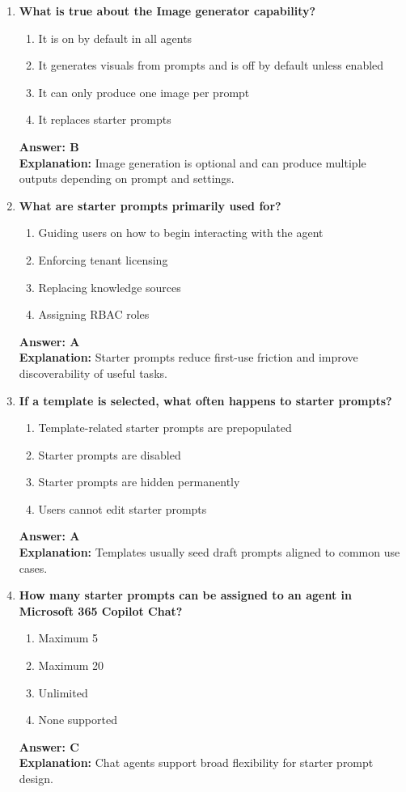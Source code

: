 \documentclass[10pt]{article}
\begin{document}
\begin{enumerate}[leftmargin=*]
\item \textbf{What is true about the Image generator capability?}
\begin{enumerate}[label=\Alph*.]
  \item It is on by default in all agents
  \item It generates visuals from prompts and is off by default unless enabled
  \item It can only produce one image per prompt
  \item It replaces starter prompts
\end{enumerate}
\textbf{Answer: B}\\
\textbf{Explanation:} Image generation is optional and can produce multiple outputs depending on prompt and settings.

\item \textbf{What are starter prompts primarily used for?}
\begin{enumerate}[label=\Alph*.]
  \item Guiding users on how to begin interacting with the agent
  \item Enforcing tenant licensing
  \item Replacing knowledge sources
  \item Assigning RBAC roles
\end{enumerate}
\textbf{Answer: A}\\
\textbf{Explanation:} Starter prompts reduce first-use friction and improve discoverability of useful tasks.

\item \textbf{If a template is selected, what often happens to starter prompts?}
\begin{enumerate}[label=\Alph*.]
  \item Template-related starter prompts are prepopulated
  \item Starter prompts are disabled
  \item Starter prompts are hidden permanently
  \item Users cannot edit starter prompts
\end{enumerate}
\textbf{Answer: A}\\
\textbf{Explanation:} Templates usually seed draft prompts aligned to common use cases.

\item \textbf{How many starter prompts can be assigned to an agent in Microsoft 365 Copilot Chat?}
\begin{enumerate}[label=\Alph*.]
  \item Maximum 5
  \item Maximum 20
  \item Unlimited
  \item None supported
\end{enumerate}
\textbf{Answer: C}\\
\textbf{Explanation:} Chat agents support broad flexibility for starter prompt design.


\end{enumerate}
\end{document}
